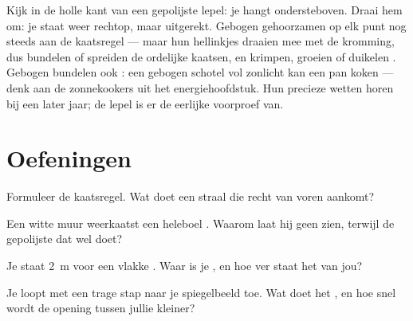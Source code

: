 \begin{remark}\label{rem:g5:mirrors-reflection:curved}
Kijk in de holle kant van een gepolijste lepel: je hangt
ondersteboven. Draai hem om: je staat weer rechtop, maar uitgerekt.
Gebogen  gehoorzamen op elk punt nog steeds aan de kaatsregel
--- maar hun hellinkjes draaien mee met de kromming, dus bundelen of
spreiden de ordelijke kaatsen, en krimpen, groeien of duikelen
. Gebogen  bundelen ook : een gebogen
schotel vol zonlicht kan een pan koken --- denk aan de zonnekookers
uit het energiehoofdstuk. Hun precieze wetten horen bij een later jaar;
de lepel is er de eerlijke voorproef van.
\end{remark}

\section{Oefeningen}

\begin{exercise}[$\star$]\label{exo:g5:mirrors-reflection:1}
Formuleer de kaatsregel. Wat doet een straal die recht van voren
aankomt?
\end{exercise}

\begin{exercise}[$\star$]\label{exo:g5:mirrors-reflection:2}
Een witte muur weerkaatst een heleboel . Waarom laat hij geen
 zien, terwijl de gepolijste  dat wel doet?
\end{exercise}

\begin{exercise}[$\star$]\label{exo:g5:mirrors-reflection:3}
Je staat \qty{2}{m} voor een vlakke . Waar is je
, en hoe ver staat het van jou?
\end{exercise}

\begin{exercise}[$\star$]\label{exo:g5:mirrors-reflection:4}
Je loopt met een trage stap naar je spiegelbeeld toe. Wat doet
het , en hoe snel wordt de opening tussen jullie kleiner?
\end{exercise}

